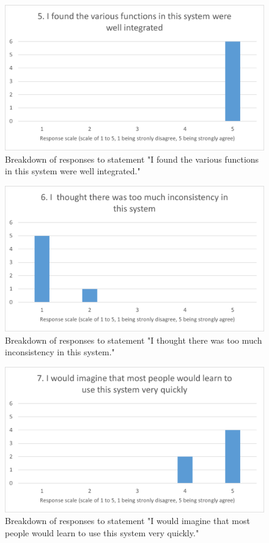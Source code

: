 \documentclass{l4proj}
\begin{document}
\begin{appendices}
\begin{figure}[h]
    \centering
    \includegraphics[width=0.7\linewidth]{images/upload/sus_results/q5.png}
    \caption{Breakdown of responses to statement "I found the various functions in this system were well integrated."}
    \label{fig:q5}
\end{figure}

\begin{figure}[h]
    \centering
    \includegraphics[width=0.7\linewidth]{images/upload/sus_results/q6.png}
    \caption{Breakdown of responses to statement "I thought there was too much inconsistency in this system."}
    \label{fig:q6}
\end{figure}

\begin{figure}[h]
    \centering
    \includegraphics[width=0.7\linewidth]{images/upload/sus_results/q7.png}
    \caption{Breakdown of responses to statement "I would imagine that most people would learn to use this system very quickly."}
    \label{fig:q7}
\end{figure}


\end{appendices}
\end{document}

